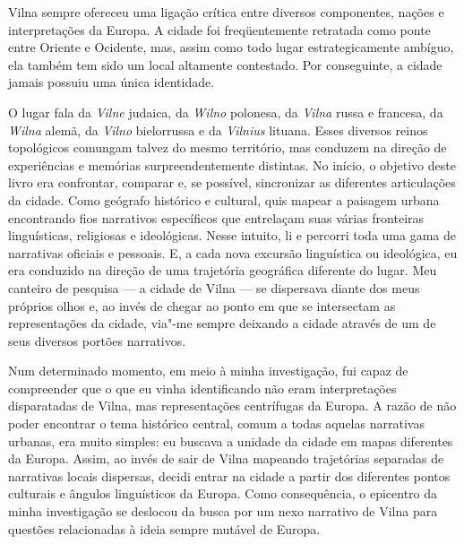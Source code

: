 Vilna sempre ofereceu uma ligação crítica entre diversos componentes,
nações e interpretações da Europa. A cidade foi freqüentemente retratada
como ponte entre Oriente e Ocidente, mas, assim como todo lugar
estrategicamente ambíguo, ela também tem sido um local altamente
contestado. Por conseguinte, a cidade jamais possuiu uma única
identidade. 

O lugar fala da \textit{Vilne} judaica, da \textit{Wilno}
polonesa, da \textit{Vilna} russa e francesa, da \textit{Wilna} alemã, da
\textit{Vilno} bielorrussa e da \textit{Vilnius} lituana. Esses diversos
reinos topológicos comungam talvez do mesmo território, mas conduzem na
direção de experiências e memórias surpreendentemente distintas. No
início, o objetivo deste livro era confrontar, comparar e, se possível,
sincronizar as diferentes articulações da cidade. Como geógrafo
histórico e cultural, quis mapear a paisagem urbana encontrando fios
narrativos específicos que entrelaçam suas várias fronteiras
linguísticas, religiosas e ideológicas. Nesse intuito, li e percorri
toda uma gama de narrativas oficiais e pessoais. E, a cada nova excursão
linguística ou ideológica, eu era conduzido na direção de uma trajetória
geográfica diferente do lugar. Meu canteiro de pesquisa --- a cidade de
Vilna --- se dispersava diante dos meus próprios olhos e, ao invés de
chegar ao ponto em que se intersectam as representações da cidade,
via"-me sempre deixando a cidade através de um de seus diversos portões
narrativos.

Num determinado momento, em meio à minha investigação, fui capaz de
compreender que o que eu vinha identificando não eram interpretações
disparatadas de Vilna, mas representações centrífugas da Europa. A razão
de não poder encontrar o tema histórico central, comum a todas aquelas
narrativas urbanas, era muito simples: eu buscava a unidade da cidade em
mapas diferentes da Europa. Assim, ao invés de sair de Vilna mapeando
trajetórias separadas de narrativas locais dispersas, decidi entrar na
cidade a partir dos diferentes pontos culturais e ângulos linguísticos
da Europa. Como consequência, o epicentro da minha investigação se
deslocou da busca por um nexo narrativo de Vilna para questões
relacionadas à ideia sempre mutável de Europa.

%

